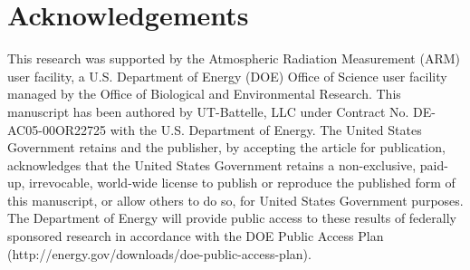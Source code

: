 \section*{Acknowledgements}
This research was supported by the Atmospheric Radiation Measurement (ARM) user 
facility, a U.S. Department of Energy (DOE) Office of Science user facility 
managed by the Office of Biological and Environmental Research.
This manuscript has been authored by UT-Battelle, LLC under Contract No. DE-AC05-00OR22725 with
the U.S. Department of Energy. The United States Government retains and 
the publisher, by accepting the article for publication, acknowledges 
that the United States Government retains a non-exclusive, paid- up, 
irrevocable, world-wide license to publish or reproduce the published 
form of this manuscript, or allow others to do so, for United States 
Government purposes. The Department of Energy will provide public access 
to these results of federally sponsored research in accordance with the 
DOE Public Access Plan (http://energy.gov/downloads/doe-public-access-plan).
